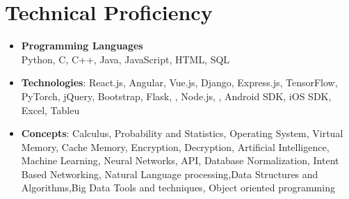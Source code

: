 \section{Technical Proficiency}
\begin{itemize}
		\item \textbf{Programming Languages}\\
        Python, C, C++, Java, JavaScript, HTML, SQL \\
		\item \textbf{Technologies}{: React.js, Angular, Vue.js, Django, Express.js, TensorFlow, PyTorch, jQuery, Bootstrap, Flask, , Node.js, , Android SDK, iOS SDK, Excel, Tableu} \\
		\item \textbf{Concepts}{: Calculus, Probability and Statistics, Operating System, Virtual Memory, Cache Memory, Encryption, Decryption, Artificial Intelligence, Machine Learning, Neural Networks, API, Database Normalization, Intent Based Networking, Natural Language processing,Data Structures and Algorithms,Big Data Tools and techniques, Object oriented programming}
\end{itemize}
